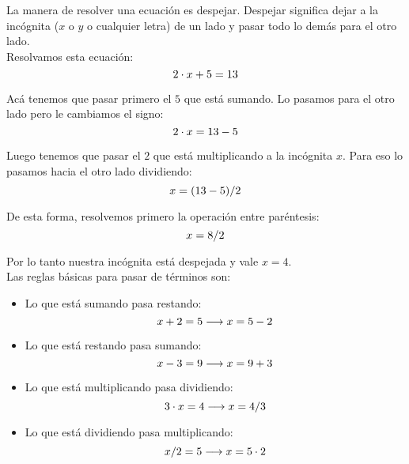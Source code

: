 La manera de resolver una ecuación es despejar. Despejar significa dejar a la incógnita ($x$ o $y$ o cualquier letra) de un lado y pasar todo lo demás para el otro lado.\\
\medskip
Resolvamos esta ecuación:\\
\begin{equation}
    \notag
    2\cdot x + 5 = 13
\end{equation}

 
Acá tenemos que pasar primero el $5$ que está sumando. Lo pasamos para  el otro lado pero le cambiamos el signo:\\
\begin{equation}
    \notag
    2\cdot x = 13 - 5
\end{equation}


Luego tenemos que pasar el $2$ que está multiplicando a la incógnita $x$. Para eso lo pasamos hacia el otro lado dividiendo:\\

\begin{equation}
    \notag
    x = (13 - 5)/2
\end{equation}



De esta forma, resolvemos primero la operación entre paréntesis:\\

\begin{equation}
    \notag
    x = 8/2
\end{equation}


Por lo tanto nuestra incógnita está despejada y vale $x=4$.\\
\medskip
Las reglas básicas para pasar de términos son:

\begin{itemize}
    \item Lo que está sumando pasa restando:
    \begin{equation}
    \notag
       x+2=5 \longrightarrow x=5-2 
    \end{equation}

       
    \item Lo que está restando pasa sumando:
    \begin{equation}
    \notag
    x-3 = 9 \longrightarrow x=9+3 
    \end{equation}
    
    \item Lo que está multiplicando pasa dividiendo: 
    \begin{equation}
    \notag
     3\cdot x =4 \longrightarrow x=4/3 
    \end{equation}
   
    \item Lo que está dividiendo pasa multiplicando: 
    \begin{equation}
    \notag
       x/2=5 \longrightarrow x=5\cdot2 
    \end{equation}
  
\end{itemize}

